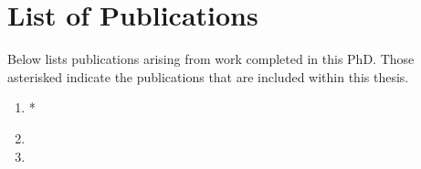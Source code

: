 \tableofcontents

\chapter*{List of Publications}
Below lists publications arising from work completed in this PhD. Those asterisked indicate the publications that are included within this thesis.

\begin{enumerate}
  \item {}*
  \item {}
  \item {}
\end{enumerate}

\printacronyms

\listoffigures

\listoftables

\lstlistoflistings